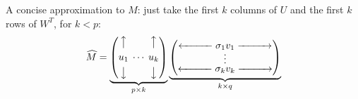 \documentclass[smaller,handout]{beamer}
\def\darkred{\color{red!70!black}}
\def\darkgreen{\color{green!60!black}}
\def\vone{{\vskip.1in}}
\begin{document}
\begin{frame}
\pause
{\darkred A concise approximation to $M$: just take the first $k$ columns of $U$ and the first $k$ rows of $W^T$, for $k < p$:
$$
\widehat{M} =
\underbrace{\begin{pmatrix}
\big\uparrow    &         & \big\uparrow \\[.05in]
u_1             &  \hskip-.2in\cdots\hskip-.2in & u_k  \\[.05in]
\big\downarrow  &         & \big\downarrow
\end{pmatrix}}_{p \times k}
\underbrace{\begin{pmatrix} 
\xleftarrow{\hspace*{1cm}} \sigma_1 v_1 \xrightarrow{\hspace*{1cm}} \\[-.05in]
\vdots \\[-0.05in]
\xleftarrow{\hspace*{1cm}} \sigma_k v_k \xrightarrow{\hspace*{1cm}} 
\end{pmatrix}}_{k \times q}
$$}

\end{frame}

\end{document}
